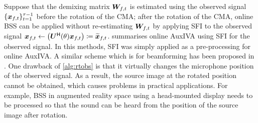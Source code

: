 \documentclass[sip,biber]{now-journal}
\begin{document}
Suppose that the demixing matrix $\Demix _{\ft}$ is estimated using the observed signal $\{\Obs _{\ft}\} _{\tframe = 1} ^{\rotFra - 1}$ before the rotation of the CMA;
after the rotation of the CMA, online BSS can be applied without re-estimating $\Demix _{\ft}$ by applying SFI to the observed signal
$\Obs _{\ft} \gets \left(\rotMat ^{\hermite} (\rotSpat) \Obs _{\ft}\right) \coloneqq \refpos{\Obs} _{\ft}$.
 summarises online AuxIVA using SFI for the observed signal.
In this methods, SFI was simply applied as a pre-processing for online AuxIVA.
A similar scheme which is for beamforming has been proposed in \cite{Wakabayashi:2023:ASLP}.
One drawback of \cref{alg:rtobs} is that it virtually changes the microphone position of the observed signal.
As a result, the source image at the rotated position cannot be obtained, which causes problems in practical applications.
For example, BSS in augmented reality space using a head-mounted display needs to be processed so that the sound can be heard from the position of the source image after rotation.
\end{document}
